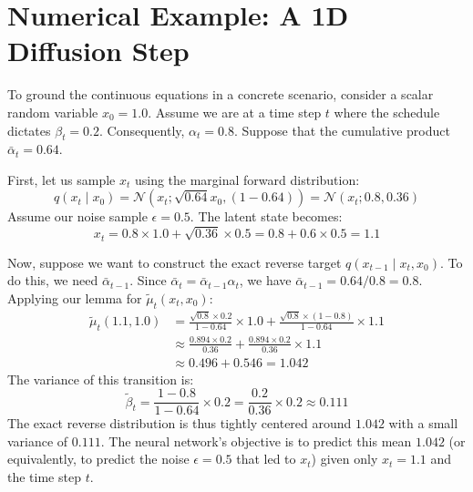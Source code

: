 \section{Numerical Example: A 1D Diffusion Step}
To ground the continuous equations in a concrete scenario, consider a scalar random variable $x_0 = 1.0$.
Assume we are at a time step $t$ where the schedule dictates $\beta_t = 0.2$. Consequently, $\alpha_t = 0.8$. Suppose that the cumulative product $\bar{\alpha}_t = 0.64$. 

First, let us sample $x_t$ using the marginal forward distribution:
\begin{equation*}
    q(x_t \mid x_0) = \mathcal{N}(x_t; \sqrt{0.64} x_0, (1 - 0.64)) = \mathcal{N}(x_t; 0.8, 0.36)
\end{equation*}
Assume our noise sample $\epsilon = 0.5$. The latent state becomes:
\begin{equation*}
    x_t = 0.8 \times 1.0 + \sqrt{0.36} \times 0.5 = 0.8 + 0.6 \times 0.5 = 1.1
\end{equation*}

Now, suppose we want to construct the exact reverse target $q(x_{t-1} \mid x_t, x_0)$. To do this, we need $\bar{\alpha}_{t-1}$. Since $\bar{\alpha}_t = \bar{\alpha}_{t-1} \alpha_t$, we have $\bar{\alpha}_{t-1} = 0.64 / 0.8 = 0.8$. 
Applying our lemma for $\tilde{\mu}_t(x_t, x_0)$:
\begin{align*}
    \tilde{\mu}_t(1.1, 1.0) &= \frac{\sqrt{0.8} \times 0.2}{1 - 0.64} \times 1.0 + \frac{\sqrt{0.8} \times (1 - 0.8)}{1 - 0.64} \times 1.1 \\
    &\approx \frac{0.894 \times 0.2}{0.36} + \frac{0.894 \times 0.2}{0.36} \times 1.1 \\
    &\approx 0.496 + 0.546 = 1.042
\end{align*}
The variance of this transition is:
\begin{equation*}
    \tilde{\beta}_t = \frac{1 - 0.8}{1 - 0.64} \times 0.2 = \frac{0.2}{0.36} \times 0.2 \approx 0.111
\end{equation*}
The exact reverse distribution is thus tightly centered around $1.042$ with a small variance of $0.111$. The neural network's objective is to predict this mean $1.042$ (or equivalently, to predict the noise $\epsilon=0.5$ that led to $x_t$) given only $x_t = 1.1$ and the time step $t$.


